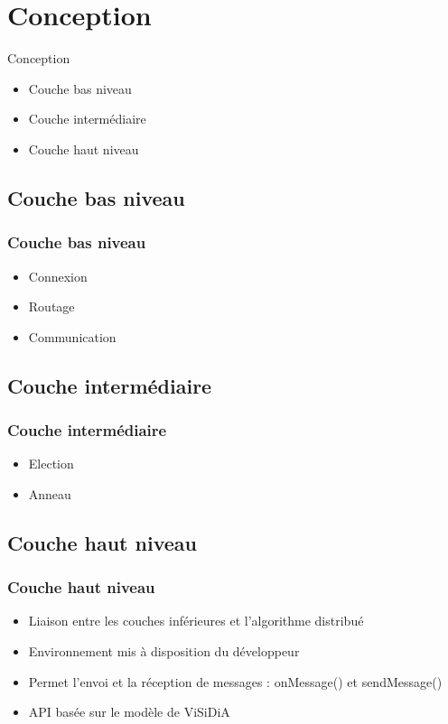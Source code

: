 \documentclass{beamer}
\begin{document}
    \section{Conception}
    \begin{frame}{Conception}
        \begin{itemize}
            \item Couche bas niveau
            \item Couche intermédiaire
            \item Couche haut niveau
        \end{itemize}
    \end{frame}
      \subsection{Couche bas niveau}
          \begin{frame}
    	    \frametitle{Couche bas niveau}
    	    \begin{itemize}
    	        \item Connexion
    	        \item Routage
    	        \item Communication
    	    \end{itemize}
          \end{frame}
      \subsection{Couche intermédiaire}
      \begin{frame}
	  \frametitle{Couche intermédiaire}
	  \begin{itemize}
	      \item Election
	      \item Anneau
	  \end{itemize}
      \end{frame}
      \subsection{Couche haut niveau}
      \begin{frame}
	  \frametitle{Couche haut niveau}
	  \begin{itemize}
	      \item Liaison entre les couches inférieures et l'algorithme distribué
	      \item Environnement mis à disposition du développeur
	      \item Permet l'envoi et la réception de messages : onMessage() et sendMessage()
	      \item API basée sur le modèle de ViSiDiA
	  \end{itemize}
      \end{frame}
\end{document}
